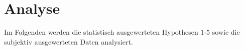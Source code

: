 \documentclass[a4paper,11pt]{article}%
\renewcommand{\\}{\vspace*{0.5\baselineskip} \newline}
\begin{document}
{\clearpage
\newpage
\section{Analyse}
Im Folgenden werden die statistisch ausgewerteten Hypothesen 1-5 sowie die subjektiv ausgewerteten Daten analysiert.

}
\end{document}
